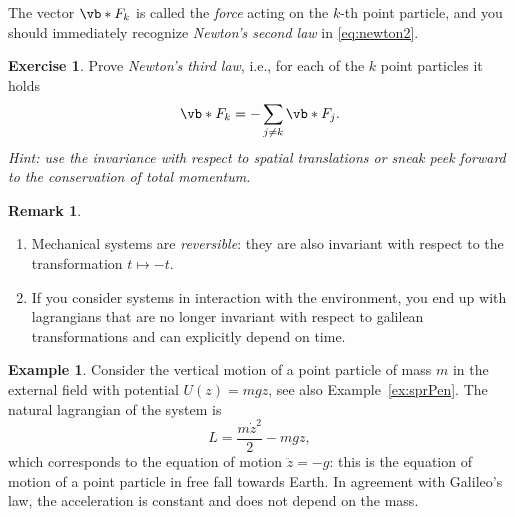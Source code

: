 \documentclass[english,fontsize=11pt,paper=b5]{scrbook}
\theoremstyle{definition}
\newtheorem{remark}{Remark}[chapter]
\newtheorem{example}{Example}[chapter]
\newtheorem{exercise}{Exercise}[chapter]
\begin{document}
    The vector $\vb*{F}_k$ is called the \emph{force} acting on the $k$-th point particle, and you should immediately recognize \emph{Newton's second law} in \eqref{eq:newton2}.

    \begin{exercise}\label{ex:N3l1}
      Prove \emph{Newton's third law}, i.e., for each of the $k$ point particles it holds
      \begin{equation}
        \vb*{F}_k = -\sum_{j\neq k} \vb*{F}_j.
      \end{equation}
      \textit{Hint: use the invariance with respect to spatial translations or sneak peek forward to the conservation of total momentum.}
    \end{exercise}

    \begin{remark}
      \begin{enumerate}
        \item Mechanical systems are \emph{reversible}: they are also invariant with respect to the transformation $t\mapsto -t$.
        \item If you consider systems in interaction with the environment, you end up with lagrangians that are no longer invariant with respect to galilean transformations and can explicitly depend on time.
      \end{enumerate}
    \end{remark}

    \begin{example}
      Consider the vertical motion of a point particle of mass $m$ in the external field with potential $U(z) = m g z$, see also Example~\ref{ex:sprPen}. The natural lagrangian of the system is
      \begin{equation}
        L = \frac{m\dot z^2}2 - mgz,
      \end{equation}
      which corresponds to the equation of motion $\ddot z = -g$: this is the equation of motion of a point particle in free fall towards Earth. In agreement with Galileo's law, the acceleration is constant and does not depend on the mass.

    \end{example}
\end{document}

